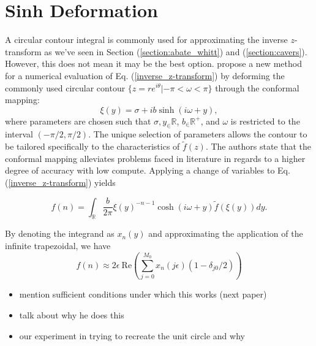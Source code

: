 \documentclass[a4paper]{report}
\begin{document}
\section{Sinh Deformation}\label{section:sinh_deformation}
A circular contour integral is commonly used for approximating the inverse $z$-transform as we've seen in Section (\ref{section:abate_whitt}) and (\ref{section:cavers}). However, this does not mean it may be the best option. \citet{levendorskii2022sinh} propose a new method for a numerical evaluation of Eq. (\ref{inverse_z-transform}) by deforming the commonly used circular contour $\{z = re^{i\theta} | -\pi < \omega < \pi\}$ through the conformal mapping:
\begin{equation}\label{equation:conformal_mapping}
    \xi(y) = \sigma + ib\sinh(i\omega + y),
\end{equation}
where parameters are chosen such that $\sigma,y_\in \mathbb{R}$, $b_\in \mathbb{R}^+$, and $\omega$ is restricted to the interval $(-\pi/2, \pi / 2)$. The unique selection of parameters allows the contour to be tailored specifically to the characteristics of $\tilde{f}(z)$. The authors state that the conformal mapping alleviates problems faced in literature \citep{boyarchenko2014efficient, boyarchenko2019sinh, schmelzer2007computing} in regards to a higher degree of accuracy with low compute.  Applying a change of variables to Eq. (\ref{inverse_z-transform}) yields

\begin{equation}
    f(n) = \int_\mathbb{R} \frac{b}{2\pi} \xi(y)^{-n-1} \cosh(i\omega + y) \tilde{f}(\xi(y)) dy.
\end{equation}

By denoting the integrand as $x_n(y)$ and approximating the application of the infinite trapezoidal, we have 
\begin{equation}
    f(n) \approx 2 \epsilon\ \text{Re}\left( \sum_{j = 0}^{M_0} x_n(j \epsilon)(1 - \delta_{j0}/2) \right)
\end{equation}


\begin{itemize}
    \item mention sufficient conditions under which this works (next paper)
    \item talk about why he does this
    \item our experiment in trying to recreate the unit circle and why
\end{itemize}
\end{document}
